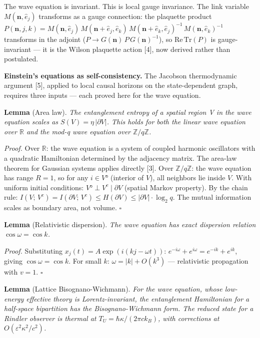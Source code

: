 \documentclass[
]{article}
\begin{document}
The wave equation is invariant. This is local gauge invariance. The link
variable \(M(\mathbf{n}, \hat{e}_j)\) transforms as a gauge connection:
the plaquette product
\(P(\mathbf{n}, j, k) = M(\mathbf{n}, \hat{e}_j)\,M(\mathbf{n}+\hat{e}_j, \hat{e}_k)\,M(\mathbf{n}+\hat{e}_k, \hat{e}_j)^{-1}\,M(\mathbf{n}, \hat{e}_k)^{-1}\)
transforms in the adjoint
(\(P \to G(\mathbf{n})\,P\,G(\mathbf{n})^{-1}\)), so
\(\mathrm{Re\,Tr}(P)\) is gauge-invariant --- it is the Wilson plaquette
action {[}4{]}, now derived rather than postulated.

\textbf{Einstein's equations as self-consistency.} The Jacobson
thermodynamic argument {[}5{]}, applied to local causal horizons on the
state-dependent graph, requires three inputs --- each proved here for
the wave equation.

\textbf{Lemma} (Area law). \emph{The entanglement entropy of a spatial
region V in the wave equation scales as \(S(V) = \eta\,|\partial V|\).
This holds for both the linear wave equation over \(\mathbb{R}\) and the
mod-q wave equation over \(\mathbb{Z}/q\mathbb{Z}\).}

\emph{Proof.} Over \(\mathbb{R}\): the wave equation is a system of
coupled harmonic oscillators with a quadratic Hamiltonian determined by
the adjacency matrix. The area-law theorem for Gaussian systems applies
directly {[}3{]}. Over \(\mathbb{Z}/q\mathbb{Z}\): the wave equation has
range \(R = 1\), so for any \(i \in V°\) (interior of \(V\)), all
neighbors lie inside \(V\). With uniform initial conditions:
\(V° \perp V^c \mid \partial V\) (spatial Markov property). By the chain
rule:
\(I(V;\, V^c) = I(\partial V;\, V^c) \leq H(\partial V) \leq |\partial V| \cdot \log_2 q\).
The mutual information scales as boundary area, not volume. \(\square\)

\textbf{Lemma} (Relativistic dispersion). \emph{The wave equation has
exact dispersion relation \(\cos\omega = \cos k\).}

\emph{Proof.} Substituting \(x_j(t) = A\exp(i(kj - \omega t))\):
\(e^{-i\omega} + e^{i\omega} = e^{-ik} + e^{ik}\), giving
\(\cos\omega = \cos k\). For small \(k\): \(\omega = |k| + O(k^3)\) ---
relativistic propagation with \(v = 1\). \(\square\)

\textbf{Lemma} (Lattice Bisognano-Wichmann). \emph{For the wave
equation, whose low-energy effective theory is Lorentz-invariant, the
entanglement Hamiltonian for a half-space bipartition has the
Bisognano-Wichmann form. The reduced state for a Rindler observer is
thermal at \(T_U = \hbar\kappa/(2\pi c k_B)\), with corrections at
\(O(\varepsilon^2\kappa^2/c^2)\).}
\end{document}
